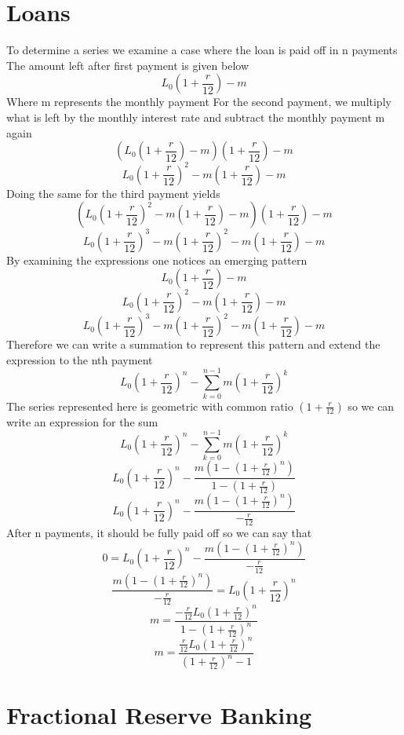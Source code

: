 \documentclass{article}
\begin{document}
\section*{Loans}
To determine a series we examine a case where the loan is paid off in n payments\newline
The amount left after first payment is given below
$$L_0(1+\frac{r}{12})-m$$
Where m represents the monthly payment\newline
For the second payment, we multiply what is left by the monthly interest rate and subtract the monthly payment m again
$$(L_0(1+\frac{r}{12})-m)(1+\frac{r}{12})-m $$
$$L_0(1+\frac{r}{12})^2-m(1+\frac{r}{12})-m $$
Doing the same for the third payment yields
$$(L_0(1+\frac{r}{12})^2-m(1+\frac{r}{12})-m)(1+\frac{r}{12})-m $$
$$L_0(1+\frac{r}{12})^3-m(1+\frac{r}{12})^2-m(1+\frac{r}{12})-m $$
By examining the expressions one notices an emerging pattern
$$L_0(1+\frac{r}{12})-m$$
$$L_0(1+\frac{r}{12})^2-m(1+\frac{r}{12})-m $$
$$L_0(1+\frac{r}{12})^3-m(1+\frac{r}{12})^2-m(1+\frac{r}{12})-m $$
Therefore we can write a summation to represent this pattern and extend the expression to the nth payment
$$L_0(1+\frac{r}{12})^n- \sum_{k=0}^{n-1} m(1+\frac{r}{12})^k $$
The series represented here is geometric with common ratio $(1+\frac{r}{12})$ so we can write an expression for the sum
$$L_0(1+\frac{r}{12})^n- \sum_{k=0}^{n-1} m(1+\frac{r}{12})^k $$
$$L_0(1+\frac{r}{12})^n- \frac{m(1-(1+\frac{r}{12})^{n})}{1-(1+\frac{r}{12})}$$
$$L_0(1+\frac{r}{12})^n- \frac{m(1-(1+\frac{r}{12})^{n})}{-\frac{r}{12}}$$
After n payments, it should be fully paid off so we can say that
$$0=L_0(1+\frac{r}{12})^n- \frac{m(1-(1+\frac{r}{12})^{n})}{-\frac{r}{12}}$$
$$\frac{m(1-(1+\frac{r}{12})^{n})}{-\frac{r}{12}}=L_0(1+\frac{r}{12})^n$$
$$m=\frac{-\frac{r}{12}L_0(1+\frac{r}{12})^n}{{1-(1+\frac{r}{12})^{n}}}$$
$$m=\frac{\frac{r}{12}L_0(1+\frac{r}{12})^n}{{(1+\frac{r}{12})^{n}-1}}$$

\section*{Fractional Reserve Banking}
\end{document}
